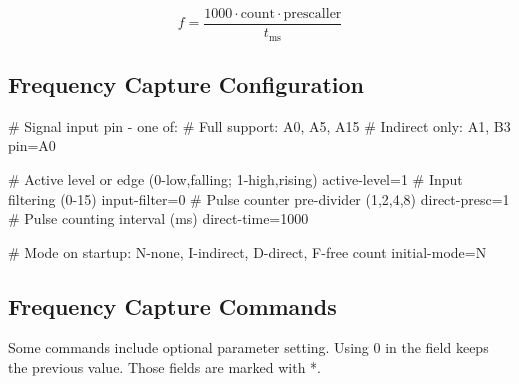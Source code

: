 \[f = \dfrac{1000\cdot\mathrm{count}\cdot\mathrm{prescaller}}
{t_\mathrm{ms}}\]



\subsection{Frequency Capture Configuration}

\begin{inicode}
[FCAP:j@10]
# Signal input pin - one of:
#  Full support:  A0, A5, A15
#  Indirect only: A1, B3
pin=A0

# Active level or edge (0-low,falling; 1-high,rising)
active-level=1
# Input filtering (0-15)
input-filter=0
# Pulse counter pre-divider (1,2,4,8)
direct-presc=1
# Pulse counting interval (ms)
direct-time=1000

# Mode on startup: N-none, I-indirect, D-direct, F-free count
initial-mode=N
\end{inicode}

\subsection{Frequency Capture Commands}

Some commands include optional parameter setting. Using 0 in the field keeps the previous value. Those fields are marked with *.

